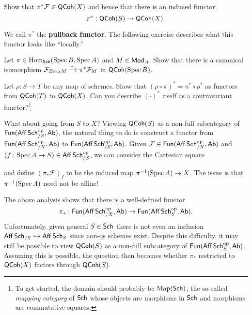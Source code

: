 \documentclass[11pt]{article}
\renewcommand{\F}{\mathcal{F}}
\begin{document}
\begin{exercise}
Show that $\pi^*\F\in\QCoh(X)$ and hence that there is an induced functor 
$$\pi^*: \QCoh(S)\to\QCoh(X).$$
\end{exercise}

We call $\pi^*$ the \textbf{pullback functor}. The following exercise describes what this functor looks like ``locally.''

\begin{exercise}
Let $\pi\in\Hom_{\Sch}(\Spec B,\Spec A)$ and $M\in\Mod_A$. Show that there is a canonical isomorphism $\F_{B\tensor_AM}\xto{\sim}\pi^*\F_M$ in $\QCoh(\Spec B)$.
\end{exercise}

\begin{exercise}
Let $\rho: S\to T$ be any map of schemes. Show that $(\rho\circ\pi)^*=\pi^*\circ\rho^*$ as functors from $\QCoh(T)$ to $\QCoh(X)$. Can you describe $(\cdot)^*$ itself as a contravariant functor?\footnote{To get started, the domain should probably be $\Map(\Sch)$, the so-called \emph{mapping category} of $\Sch$ whose objects are morphisms in $\Sch$ and morphisms are commutative squares.}
\end{exercise}

What about going from $S$ to $X$? Viewing $\QCoh(S)$ as a non-full subcategory of $\Fun(\Aff\Sch_{/S}^{\op},\Ab)$, the natural thing to do is construct a functor from $\Fun(\Aff\Sch_{/X}^{\op},\Ab)$ to $\Fun(\Aff\Sch_{/S}^{\op},\Ab)$. Given $\F\in\Fun(\Aff\Sch_{/X}^{\op},\Ab)$ and $(f: \Spec A\to S)\in\Aff\Sch_{/S}^{\op}$, we can consider the Cartesian square
\begin{center}
\end{center}
and define $(\pi_*\F)_f$ to be the induced map $\pi^{-1}(\Spec A)\to X$. The issue is that $\pi^{-1}(\Spec A)$ need not be affine! 

\begin{remark}
The above analysis shows that there is a well-defined functor 
$$\pi_*: \Fun(\Aff\Sch_{/X}^{\op},\Ab)\to\Fun(\Aff\Sch_S^{\op},\Ab).$$
Unfortunately, given general $S\in\Sch$ there is not even an inclusion $\Aff\Sch_{/S}\inj\Aff\Sch_S$ since non-qs schemes exist. Despite this difficulty, it may still be possible to view $\QCoh(S)$ as a non-full subcategory of $\Fun(\Aff\Sch_S^{\op},\Ab)$. Assuming this is possible, the question then becomes whether $\pi_*$ restricted to $\QCoh(X)$ factors through $\QCoh(S)$.
\end{remark}
\end{document}
